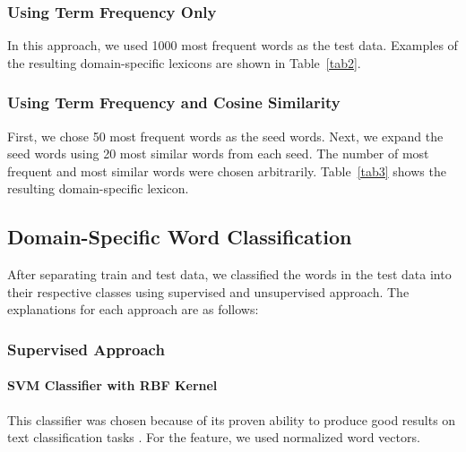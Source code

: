 \documentclass[a4paper,conference]{IEEEtran}
\begin{document}
\subsubsection{Using Term Frequency Only}
In this approach, we used 1000 most frequent words as the test data. Examples of the resulting domain-specific lexicons are shown in Table~\ref{tab2}.

\subsubsection{Using Term Frequency and Cosine Similarity}
First, we chose 50 most frequent words as the seed words. Next, we expand the seed words using 20 most similar words from each seed. The number of most frequent and most similar words were chosen arbitrarily. Table~\ref{tab3} shows the resulting domain-specific lexicon.

\subsection{Domain-Specific Word Classification}
After separating train and test data, we classified the words in the test data into their respective classes using supervised and unsupervised approach. The explanations for each approach are as follows:

\subsubsection{Supervised Approach}
\paragraph{SVM Classifier with RBF Kernel}
This classifier was chosen because of its proven ability to produce good results on text classification tasks \cite{b15}. For the feature, we used normalized word vectors.
\end{document}
